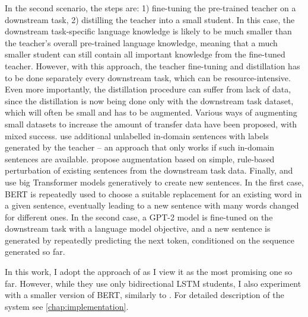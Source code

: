 \documentclass[bsc,frontabs,twoside,singlespacing,parskip,deptreport]{infthesis}
\begin{document}
{{{      %
      In the second scenario, the steps are: 1) fine-tuning the pre-trained teacher on a downstream task, 2) distilling the teacher into a small student. 
      In this case, the downstream task-specific language knowledge is likely to be much smaller than the teacher's overall pre-trained language knowledge, meaning that a much smaller student can still contain all important knowledge from the fine-tuned teacher. 
      However, with this approach, the teacher fine-tuning and distillation has to be done separately every downstream task, which can be resource-intensive.
      Even more importantly, the distillation procedure can suffer from lack of data, since the distillation is now being done only with the downstream task dataset, which will often be small and has to be augmented.
      Various ways of augmenting small datasets to increase the amount of transfer data have been proposed, with mixed success. 
      \citet{Mukherjee_2019} use additional unlabelled in-domain sentences with labels generated by the teacher -- an approach that only works if such in-domain sentences are available. \citet{Tang_2019a} propose augmentation based on simple, rule-based perturbation of existing sentences from the downstream task data. Finally, \citet{Jiao_2019} and \citet{Tang_2019b} use big Transformer models generatively to create new sentences. In the first case, BERT is repeatedly used to choose a suitable replacement for an existing word in a given sentence, eventually leading to a new sentence with many words changed for different ones. In the second case, a GPT-2 model is fine-tuned on the downstream task with a language model objective, and a new sentence is generated by repeatedly predicting the next token, conditioned on the sequence generated so far.

      In this work, I adopt the approach of \citet{Tang_2019b} as I view it as the most promising one so far. However, while they use only bidirectional LSTM students, I also experiment with a smaller version of BERT, similarly to \citet{Jiao_2019}. For detailed description of the system see \autoref{chap:implementation}.
    }
  }
  
}
\end{document}

